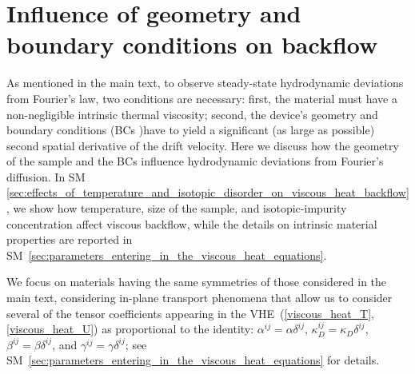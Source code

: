 \documentclass[
prb,
twocolumn,
superscriptaddress,
 amsmath,amssymb,
 aps,
longbibliography,
]{revtex4-2}
\begin{document}
\section{Influence of geometry and boundary conditions on backflow}
\label{sec:BC_steady_state}

As mentioned in the main text, to observe steady-state hydrodynamic deviations from Fourier's law, two conditions are necessary: first, the material must have a non-negligible intrinsic thermal viscosity; second, the device's geometry and boundary conditions (BCs )have to yield a significant (as large as possible) second spatial derivative of the drift velocity.
Here we discuss how the geometry of the sample and the BCs influence hydrodynamic deviations from Fourier's diffusion. In SM \ref{sec:effects_of_temperature_and_isotopic_disorder_on_viscous_heat_backflow}, we show how temperature, size of the sample, and isotopic-impurity concentration affect viscous backflow, while the details on intrinsic material properties are reported in SM~\ref{sec:parameters_entering_in_the_viscous_heat_equations}.

We focus on materials having the same symmetries of those considered in the main text, considering in-plane transport phenomena that allow us to consider several of the tensor coefficients appearing in the VHE~(\ref{viscous_heat_T},\ref{viscous_heat_U}) as proportional to the identity: $\alpha^{ij}=\alpha\delta^{ij}$, $\kappa_D^{ij}=\kappa_D\delta^{ij}$, $\beta^{ij}=\beta\delta^{ij}$, and $\gamma^{ij}=\gamma\delta^{ij}$; see SM~\ref{sec:parameters_entering_in_the_viscous_heat_equations} for details.
\end{document}
